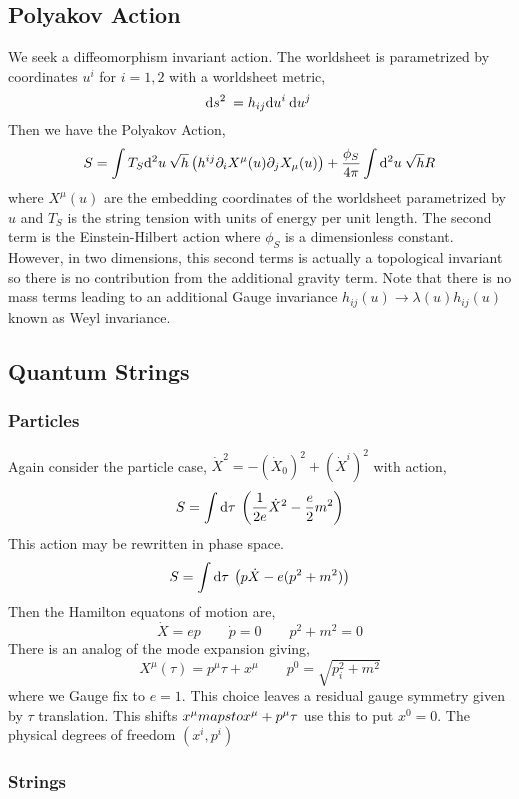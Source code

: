 \documentclass[12pt]{extarticle}
\begin{document}
\subsection{Polyakov Action}

We seek a diffeomorphism invariant action. The worldsheet is parametrized by coordinates $u^i$ for $i = 1,2$ with a worldsheet metric,
\[ \mathrm{d}s^2 \: = h_{ij} \mathrm{d}u^i \: \mathrm{d}u^j \: \]
Then we have the Polyakov Action,
\[ S = \int T_S \mathrm{d}^{2} u \: \sqrt{h} \left( h^{ij} \partial_i X^\mu(u) \partial_j X_\mu(u) \right) + \frac{\phi_S}{4 \pi} \int \mathrm{d}^{2} u \: \sqrt{h} R \] 
where $X^\mu(u)$ are the embedding coordinates of the worldsheet parametrized by $u$ and $T_S$ is the string tension with units of energy per unit length. The second term is the Einstein-Hilbert action where $\phi_S$ is a dimensionless constant. However, in two dimensions, this second terms is actually a topological invariant so there is no contribution from the additional gravity term. Note that there is no mass terms leading to an additional Gauge invariance $h_{ij}(u) \to \lambda(u) h_{ij}(u)$ known as Weyl invariance.  

\subsection{Quantum Strings}


\subsubsection{Particles}

Again consider the particle case, $\dot{X}^2 = -(\dot{X}_0)^2 + (\dot{X}^i)^2$ with action,
\[ S = \int \mathrm{d}\tau \: \left( \frac{1}{2 e} \dot{X}^2 - \frac{e}{2} m^2 \right) \]
This action may be rewritten in phase space.
\[ S = \int \mathrm{d}\tau \: \left( p \dot{X} - e(p^2 + m^2) \right) \]
Then the Hamilton equatons of motion are,
\[ \dot{X} = e p \quad \quad \dot{p} = 0 \quad \quad p^2 + m^2 = 0 \]
There is an analog of the mode expansion giving,
\[ X^\mu(\tau) = p^\mu \tau + x^\mu \quad \quad p^0 = \sqrt{p_i^2 + m^2} \]
where we Gauge fix to $e = 1$. This choice leaves a residual gauge symmetry given by $\tau$ translation. This shifts $x^\mu \\mapsto x^\mu + p^\mu \tau$ use this to put $x^0 = 0$. The physical degrees of freedom $(x^i, p^i)$

\subsubsection{Strings}
\end{document}
